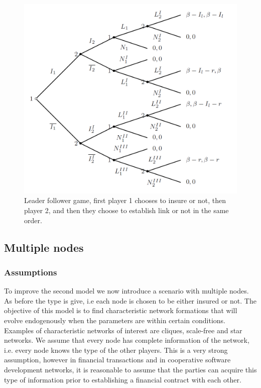 \begin{figure}[h]
\centering
  \includegraphics[width=0.9\linewidth]{../Figures/stackelberggame.png}
  \caption{\label{fig:stackelberg} Leader follower game, first player 1 chooses to insure or not, then player 2, and then they choose to establish link or not in the same order.}
\end{figure}


\subsection{Multiple nodes}
\subsubsection{Assumptions}
To improve the second model we now introduce a scenario with multiple nodes. As before the type is give, i.e each node is chosen to be either insured or not. The objective of this model is to find characteristic network formations that will evolve endogenously when the parameters are within certain conditions. Examples of characteristic networks of interest are cliques, scale-free and star networks.
We assume that every node has complete information of the network, i.e. every node knows the type of the other players. This is a very strong assumption, however in financial transactions and in cooperative software development networks, it is reasonable to assume that the parties can acquire this type of information prior to establishing a financial contract with each other.
